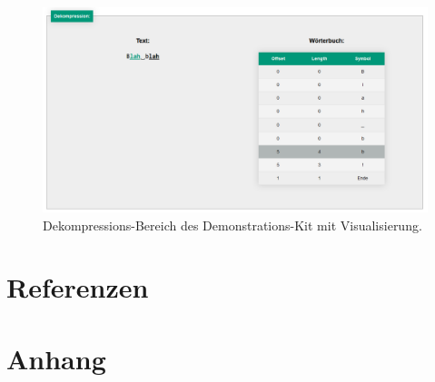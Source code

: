 \documentclass[10pt, a4paper]{article}
\begin{document}
\begin{figure}[H]
    \centering
    \includegraphics[scale=0.45]{pictures/Dekompression.png}
    \caption{Dekompressions-Bereich des Demonstrations-Kit mit Visualisierung.}
\end{figure}

\newpage
\section{Referenzen}


\newpage

\section{Anhang}
\end{document}
